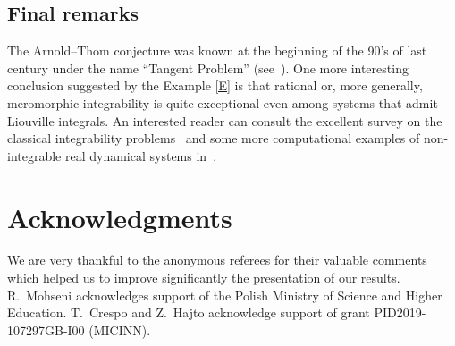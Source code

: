 \documentclass[pdftex]{sigma}%
\numberwithin{equation}{section}
\begin{document}
\subsection{Final remarks}

The Arnold--Thom conjecture was known at the beginning of the 90's of last century under the name ``Tangent Problem'' (see~\cite[Section~9]{L}).
One more interesting conclusion suggested by the Example \ref{E} is that rational or, more generally, meromorphic integrability is quite exceptional even among systems that admit Liouville integrals. An interested reader can consult the excellent survey on the classical integrability problems~\cite{MP} and some more computational examples of non-integrable real dynamical systems in~\cite{HM}.

\section*{Acknowledgments}

We are very thankful to the anonymous referees for their valuable comments which helped us to improve significantly the presentation of our results.
R.~Mohseni acknowledges support of the Polish Ministry of Science and
Higher Education. T.~Crespo and Z.~Hajto acknowledge support of
grant PID2019-107297GB-I00 (MICINN).
\end{document}
